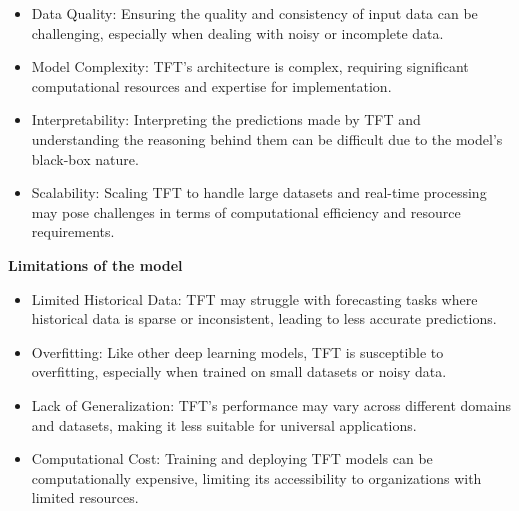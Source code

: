 	\begin{frame}
\begin{itemize}
	\item Data Quality: Ensuring the quality and consistency of input data can be challenging, especially when dealing with noisy or incomplete data.
	\item Model Complexity: TFT's architecture is complex, requiring significant computational resources and expertise for implementation.
	\item Interpretability: Interpreting the predictions made by TFT and understanding the reasoning behind them can be difficult due to the model's black-box nature.
	\item Scalability: Scaling TFT to handle large datasets and real-time processing may pose challenges in terms of computational efficiency and resource requirements.
\end{itemize}
\end{frame}


\begin{frame}
	\textbf{Limitations of the model}
	
\begin{itemize}
	\item Limited Historical Data: TFT may struggle with forecasting tasks where historical data is sparse or inconsistent, leading to less accurate predictions.
	\item Overfitting: Like other deep learning models, TFT is susceptible to overfitting, especially when trained on small datasets or noisy data.
	\item Lack of Generalization: TFT's performance may vary across different domains and datasets, making it less suitable for universal applications.
	\item Computational Cost: Training and deploying TFT models can be computationally expensive, limiting its accessibility to organizations with limited resources.
\end{itemize}
	

\end{frame}

